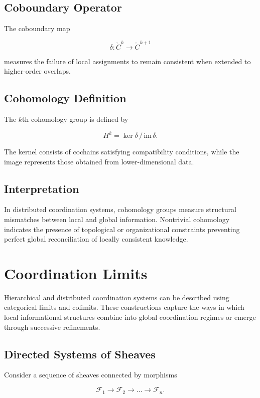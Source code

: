 \documentclass[12pt]{article}
\begin{document}
\subsection{Coboundary Operator}

The coboundary map

\[
\delta : \check{C}^k \rightarrow \check{C}^{k+1}
\]

measures the failure of local assignments to remain consistent when extended to higher-order overlaps.

\subsection{Cohomology Definition}

The $k$th cohomology group is defined by

\[
H^k = \ker \delta \, / \, \mathrm{im}\,\delta.
\]

The kernel consists of cochains satisfying compatibility conditions, while the image represents those obtained from lower-dimensional data.

\subsection{Interpretation}

In distributed coordination systems, cohomology groups measure structural mismatches between local and global information. Nontrivial cohomology indicates the presence of topological or organizational constraints preventing perfect global reconciliation of locally consistent knowledge.

\section{Coordination Limits}

Hierarchical and distributed coordination systems can be described using categorical limits and colimits. These constructions capture the ways in which local informational structures combine into global coordination regimes or emerge through successive refinements.

\subsection{Directed Systems of Sheaves}

Consider a sequence of sheaves connected by morphisms

\[
\mathcal{F}_1 \rightarrow \mathcal{F}_2 \rightarrow \dots \rightarrow \mathcal{F}_n.
\]
\end{document}
